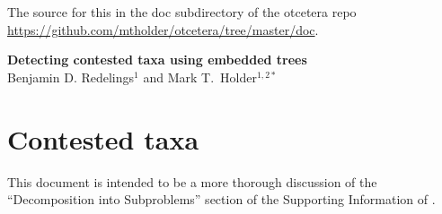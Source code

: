 \documentclass[11pt]{article}
\begin{document}
The source for this in the doc subdirectory of the otcetera
    repo \url{https://github.com/mtholder/otcetera/tree/master/doc}.
\begin{center}
    {\bf Detecting contested taxa using embedded trees} \\
{Benjamin D. Redelings$^{1}$ and Mark T.~Holder$^{1,2\ast}$}
\end{center}
\tableofcontents
\section{Contested taxa}
This document is intended to be a more thorough discussion of the
    ``Decomposition into Subproblems'' section of the Supporting
    Information of \citep{HinchliffEtAl2015}.

\end{document}
